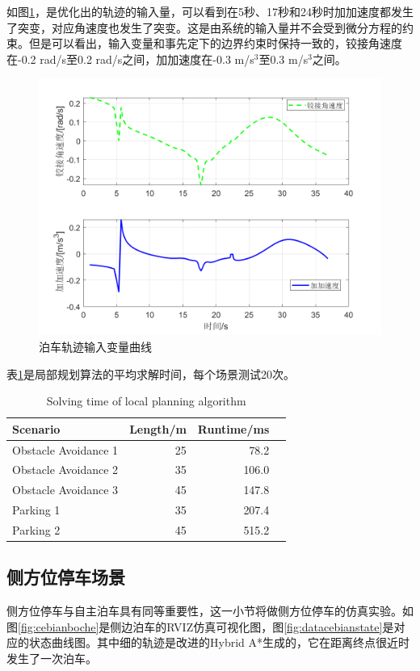 \documentclass[master,academic]{ysuthesis} %
\begin{document}
		如图\ref{fig:databocheinput}，是优化出的轨迹的输入量，可以看到在5秒、17秒和24秒时加加速度都发生了突变，对应角速度也发生了突变。这是由系统的输入量并不会受到微分方程的约束。但是可以看出，输入变量和事先定下的边界约束时保持一致的，铰接角速度在-0.2 rad/s至0.2 rad/s之间，加加速度在-0.3 m/s$^3$至0.3 m/s$^3$之间。
		\begin{figure}[H]
			\centering
			\includegraphics[width=1\textwidth]{databocheinput.png}
			\caption{泊车轨迹输入变量曲线}
			\label{fig:databocheinput}
		\end{figure}

		表\ref{tab:local_planning_boche_time}是局部规划算法的平均求解时间，每个场景测试20次。
		\begin{table}[!ht]
			\caption{Solving time of local planning algorithm}
			\label{tab:local_planning_boche_time}
			\centering
			\begin{tabular}{l rrr}
				\toprule
				Scenario   &  Length/m & Runtime/ms \\
				\midrule
				Obstacle Avoidance 1 & 25    & 78.2   \\
				Obstacle Avoidance 2 & 35    & 106.0  \\
				Obstacle Avoidance 3 & 45    & 147.8  \\
				Parking 1  & 35   & 207.4  \\
				Parking 2  & 45   & 515.2  \\
				\bottomrule
			\end{tabular}
		\end{table}


		\subsection{侧方位停车场景}
		侧方位停车与自主泊车具有同等重要性，这一小节将做侧方位停车的仿真实验。如图\ref{fig:cebianboche}是侧边泊车的RVIZ仿真可视化图，图\ref{fig:datacebianstate}是对应的状态曲线图。其中细的轨迹是改进的Hybrid A*生成的，它在距离终点很近时发生了一次泊车。
		
\end{document}
